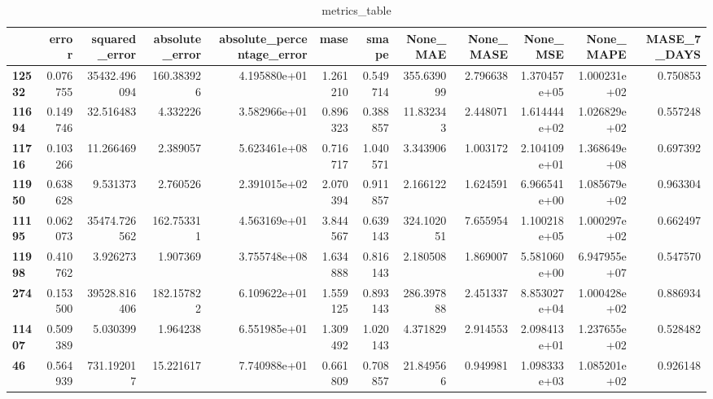 \begin{table}[h]
\centering
\caption{metrics_table}
\label{table:Experiment with CNN AE and LSTM hybrid method. Local, multivariate, dataset 2. Tuned with LSTM Local Multivariate dataset 2}
\begin{tabular}{lrrrrrrrrrrr}
\toprule
{} &     error &  squared\_error &  absolute\_error &  absolute\_percentage\_error &      mase &     smape &     None\_MAE &  None\_MASE &      None\_MSE &     None\_MAPE &  MASE\_7\_DAYS \\
\midrule
\textbf{12532} &  0.076755 &   35432.496094 &      160.383926 &               4.195880e+01 &  1.261210 &  0.549714 &   355.639099 &   2.796638 &  1.370457e+05 &  1.000231e+02 &     0.750853 \\
\textbf{11694} &  0.149746 &      32.516483 &        4.332226 &               3.582966e+01 &  0.896323 &  0.388857 &    11.832343 &   2.448071 &  1.614444e+02 &  1.026829e+02 &     0.557248 \\
\textbf{11716} &  0.103266 &      11.266469 &        2.389057 &               5.623461e+08 &  0.716717 &  1.040571 &     3.343906 &   1.003172 &  2.104109e+01 &  1.368649e+08 &     0.697392 \\
\textbf{11950} &  0.638628 &       9.531373 &        2.760526 &               2.391015e+02 &  2.070394 &  0.911857 &     2.166122 &   1.624591 &  6.966541e+00 &  1.085679e+02 &     0.963304 \\
\textbf{11195} &  0.062073 &   35474.726562 &      162.753311 &               4.563169e+01 &  3.844567 &  0.639143 &   324.102051 &   7.655954 &  1.100218e+05 &  1.000297e+02 &     0.662497 \\
\textbf{11998} &  0.410762 &       3.926273 &        1.907369 &               3.755748e+08 &  1.634888 &  0.816143 &     2.180508 &   1.869007 &  5.581060e+00 &  6.947955e+07 &     0.547570 \\
\textbf{274  } &  0.153500 &   39528.816406 &      182.157822 &               6.109622e+01 &  1.559125 &  0.893143 &   286.397888 &   2.451337 &  8.853027e+04 &  1.000428e+02 &     0.886934 \\
\textbf{11407} &  0.509389 &       5.030399 &        1.964238 &               6.551985e+01 &  1.309492 &  1.020143 &     4.371829 &   2.914553 &  2.098413e+01 &  1.237655e+02 &     0.528482 \\
\textbf{46   } &  0.564939 &     731.192017 &       15.221617 &               7.740988e+01 &  0.661809 &  0.708857 &    21.849566 &   0.949981 &  1.098333e+03 &  1.085201e+02 &     0.926148 \\

\end{tabular}
\end{table}
